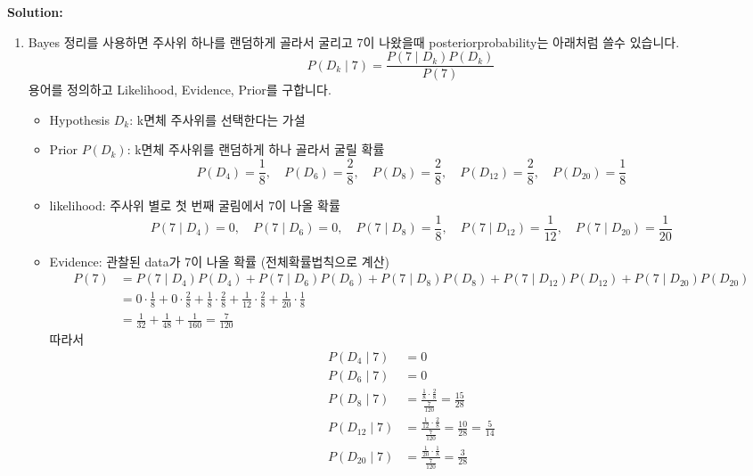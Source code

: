 \documentclass{article}
\newenvironment{solution}
{
    \par\medskip
    \noindent\textbf{Solution:}
    \begin{adjustwidth}{1em}{0em}
}
{
    \end{adjustwidth}
    \medskip
}
\begin{document}
\begin{enumerate}[label=\textbf{\arabic*.}, leftmargin=*]
\begin{solution}
\begin{enumerate}[label=(\alph*), leftmargin=2em, itemsep=1em]
            \item Bayes 정리를 사용하면 주사위 하나를 랜덤하게 골라서 굴리고 7이 나왔을때 posteriorprobability는 아래처럼 쓸수 있습니다.
            $$  
            P(D_k\mid 7)=\frac{P(7\mid D_k)P(D_k)}{P(7)}  
            $$  
            용어를 정의하고 Likelihood, Evidence, Prior를 구합니다.\\
            \begin{itemize}[itemsep=0em]
                \item Hypothesis $D_k$: k면체 주사위를 선택한다는 가설
                \item Prior $P(D_k)$: k면체 주사위를 랜덤하게 하나 골라서 굴릴 확률
                $$  
                P(D_4)=\frac18,\quad P(D_6)=\frac28,\quad P(D_8)=\frac28,\quad P(D_{12})=\frac28,\quad P(D_{20})=\frac18  
                $$
                \item likelihood: 주사위 별로 첫 번째 굴림에서 $7$이 나올 확률  
                $$  
                P(7\mid D_4)=0,\quad P(7\mid D_6)=0,\quad P(7\mid D_8)=\frac18,\quad P(7\mid D_{12})=\frac1{12},\quad P(7\mid D_{20})=\frac1{20}  
                $$  
                \item Evidence: 관찰된 data가 7이 나올 확률 (전체확률법칙으로 계산)
                    \begin{align*}
                        P(7)&=P(7\mid D_4)P(D_4)+P(7\mid D_6)P(D_6)+P(7\mid D_8)P(D_8)+P(7\mid D_{12})P(D_{12})+P(7\mid D_{20})P(D_{20})\\  
                        &=0\cdot\frac18+0\cdot\frac28+\frac18\cdot\frac28+\frac1{12}\cdot\frac28+\frac1{20}\cdot\frac18 \\ 
                        &=\frac1{32}+\frac1{48}+\frac1{160}=\frac7{120}
                    \end{align*}
            따라서  
                \begin{align*}
                    P(D_4\mid 7)&=0\\
                    P(D_6\mid 7)&=0\\
                    P(D_8\mid 7)&=\frac{\frac18\cdot\frac28}{\frac7{120}}=\frac{15}{28}\\
                    P(D_{12}\mid 7)&=\frac{\frac1{12}\cdot\frac28}{\frac7{120}}=\frac{10}{28}=\frac5{14}\\
                    P(D_{20}\mid 7)&=\frac{\frac1{20}\cdot\frac18}{\frac7{120}}=\frac3{28}
                \end{align*}

            \end{itemize}


\end{enumerate}
\end{solution}
\end{enumerate}
\end{document}
